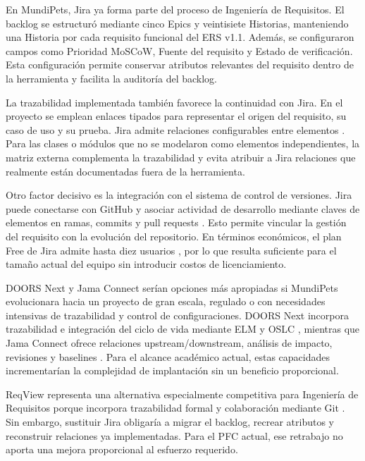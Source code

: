 \documentclass[journal,onecolumn]{IEEEtran}
\begin{document}
	En MundiPets, Jira ya forma parte del proceso de Ingeniería de
	Requisitos. El backlog se estructuró mediante cinco Epics y
	veintisiete Historias, manteniendo una Historia por cada requisito
	funcional del ERS v1.1. Además, se configuraron campos como Prioridad
	MoSCoW, Fuente del requisito y Estado de verificación. Esta
	configuración permite conservar atributos relevantes del requisito
	dentro de la herramienta y facilita la auditoría del backlog.
	
	La trazabilidad implementada también favorece la continuidad con
	Jira. En el proyecto se emplean enlaces tipados para representar el
	origen del requisito, su caso de uso y su prueba. Jira admite
	relaciones configurables entre elementos \cite{atlassian_link_work_items}.
	Para las clases o módulos que no se modelaron como elementos
	independientes, la matriz externa complementa la trazabilidad y evita
	atribuir a Jira relaciones que realmente están documentadas fuera de
	la herramienta.
	
	Otro factor decisivo es la integración con el sistema de control de
	versiones. Jira puede conectarse con GitHub y asociar actividad de
	desarrollo mediante claves de elementos en ramas, commits y pull
	requests \cite{atlassian_github_jira}. Esto permite vincular la
	gestión del requisito con la evolución del repositorio. En términos
	económicos, el plan Free de Jira admite hasta diez usuarios
	\cite{atlassian_jira_pricing}, por lo que resulta suficiente para el
	tamaño actual del equipo sin introducir costos de licenciamiento.
	
	DOORS Next y Jama Connect serían opciones más apropiadas si MundiPets
	evolucionara hacia un proyecto de gran escala, regulado o con
	necesidades intensivas de trazabilidad y control de configuraciones.
	DOORS Next incorpora trazabilidad e integración del ciclo de vida
	mediante ELM y OSLC \cite{ibm_doors_overview,ibm_doors_oslc}, mientras
	que Jama Connect ofrece relaciones upstream/downstream, análisis de
	impacto, revisiones y baselines \cite{jama_features,jama_pricing}.
	Para el alcance académico actual, estas capacidades incrementarían la
	complejidad de implantación sin un beneficio proporcional.
	
	ReqView representa una alternativa especialmente competitiva para
	Ingeniería de Requisitos porque incorpora trazabilidad formal y
	colaboración mediante Git \cite{reqview_traceability,reqview_quickstart}.
	Sin embargo, sustituir Jira obligaría a migrar el backlog, recrear
	atributos y reconstruir relaciones ya implementadas. Para el PFC
	actual, ese retrabajo no aporta una mejora proporcional al esfuerzo
	requerido.
	
\end{document}
